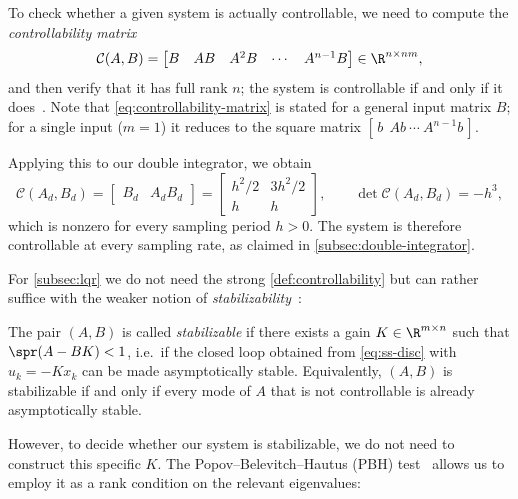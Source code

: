 To check whether a given system is actually controllable, we need to compute the
\emph{controllability matrix}~
\begin{equation}
    \label{eq:controllability-matrix}
    \mathcal{C}(A, B) =
    \begin{bmatrix} B & AB & A^{2}B & \cdots & A^{n-1}B \end{bmatrix}
    \in \R^{n \times nm},
\end{equation}
and then verify that it has full rank $n$; the system is controllable if and
only if it does~. Note that \eqref{eq:controllability-matrix} is stated for a general
input matrix $B$; for a single input ($m = 1$) it reduces to the square
matrix $[\,b\ \ Ab\ \cdots\ A^{n-1}b\,]$.

Applying this to our double integrator, we obtain
\begin{equation}
    \label{eq:di-controllability}
    \mathcal{C}(A_d, B_d) =
    \begin{bmatrix} B_d & A_d B_d \end{bmatrix}
    = \begin{bmatrix} h^{2}/2 & 3h^{2}/2 \\ h & h \end{bmatrix},
    \qquad
    \det \mathcal{C}(A_d, B_d) = -h^{3},
\end{equation}
which is nonzero for every sampling period $h > 0$. The system is therefore
controllable at every sampling rate, as claimed in
\cref{subsec:double-integrator}.

For \cref{subsec:lqr} we do not need the strong \cref{def:controllability}
but can rather suffice with the weaker notion of \emph{stabilizability}~:

\begin{definition}[Stabilizability]
\label{def:stabilizability}
The pair $(A, B)$ is called \emph{stabilizable} if there exists a gain
$K \in \R^{m \times n}$ such that $\spr(A - BK) < 1$, i.e.\ if the closed loop
obtained from \eqref{eq:ss-disc} with $u_k = -K x_k$ can be made asymptotically
stable. Equivalently, $(A,B)$ is stabilizable if and only if every mode of $A$
that is not controllable is already asymptotically stable.
\end{definition}

However, to decide whether our system is stabilizable,
we do not need to construct this specific $K$. The
Popov--Belevitch--Hautus (PBH) test~
allows us to employ it as a rank condition on the relevant eigenvalues:

